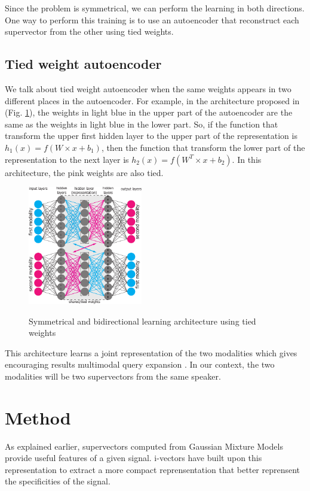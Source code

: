 \documentclass[conference]{IEEEtran}
\begin{document}
Since the problem is symmetrical, we can perform the learning in both directions. One way to perform this training is to use an autoencoder that reconstruct each supervector from the other using tied weights.

\subsection{Tied weight autoencoder}


We talk about tied weight autoencoder when the same weights appears in two different places in the autoencoder. For example, in the architecture proposed in \cite{vukotic:hal-01314302}
(Fig. \ref{archi_vedran}), the weights in light blue in the upper part of the autoencoder are the same as the weights in light blue in the lower part. So, if the function that transform the upper first hidden layer to the upper part of the representation is $h_1(x) = f(W \times x + b_1)$, then  the function that transform the lower part of the representation to the next layer is $h_2(x) = f(W^T \times x + b_2)$. In this architecture, the pink weights are also tied. 

\begin{figure}[!h]
    \centering
    \caption{Symmetrical and bidirectional learning architecture using tied weights}
    \includegraphics[width=5cm]{archi-vedran.pdf}
    \label{archi_vedran}
\end{figure}

This architecture learns a joint representation of the two modalities which gives encouraging results multimodal query expansion \cite{vukotic:hal-01314302}. In our context, the two modalities will be two supervectors from the same speaker.

\section{Method}
\label{sec:Method}

As explained earlier, supervectors computed from Gaussian Mixture Models provide
useful features of a given signal. i-vectors have built upon this representation
to extract a more compact reprensentation that better reprensent the
specificities of the signal.
\end{document}
